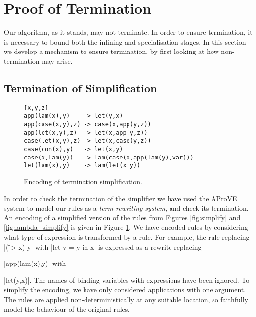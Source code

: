 \documentclass[preprint]{sigplanconf}
\begin{document}
\section{Proof of Termination}
\label{sec:termination}

\begin{comment}
We can remove all data types by encoding them as functions, as described in \citet{naylor:reduceron}. If we then had a transformation which made the program first-order \textit{without} introducing any data types, we would end up with a program without data or closures, which is incapable of storing an unbounded amount of information. Since with higher-order functions we can implement a Turing machine \cite{turing:halting}, and without an unbounded store we cannot, such a transformation cannot exist.
\end{comment}

Our algorithm, as it stands, may not terminate. In order to ensure termination, it is necessary to bound both the inlining and specialisation stages. In this section we develop a mechanism to ensure termination, by first looking at how non-termination may arise.

\subsection{Termination of Simplification}
\label{sec:termination_simplification}

\begin{figure}
\bigskip
\begin{verbatim}
[x,y,z]
app(lam(x),y)    -> let(y,x)
app(case(x,y),z) -> case(x,app(y,z))
app(let(x,y),z)  -> let(x,app(y,z))
case(let(x,y),z) -> let(x,case(y,z))
case(con(x),y)   -> let(x,y)
case(x,lam(y))   -> lam(case(x,app(lam(y),var)))
let(lam(x),y)    -> lam(let(x,y))
\end{verbatim}
\bigskip
\caption{Encoding of termination simplification.}
\label{fig:term_simplification}
\end{figure}

In order to check the termination of the simplifier we have used the AProVE system \cite{aprove} to model our rules as a \textit{term rewriting system}, and check its termination. An encoding of a simplified version of the rules from Figures \ref{fig:simplify} and \ref{fig:lambda_simplify} is given in Figure \ref{fig:term_simplification}. We have encoded rules by considering what type of expression is transformed by a rule. For example, the rule replacing |(\v -> x) y| with |let v = y in x| is expressed as a rewrite replacing \ignore|app(lam(x),y)| with \ignore|let(y,x)|. The names of binding variables with expressions have been ignored. To simplify the encoding, we have only considered applications with one argument. The rules are applied non-deterministically at any suitable location, so faithfully model the behaviour of the original rules.
\end{document}
